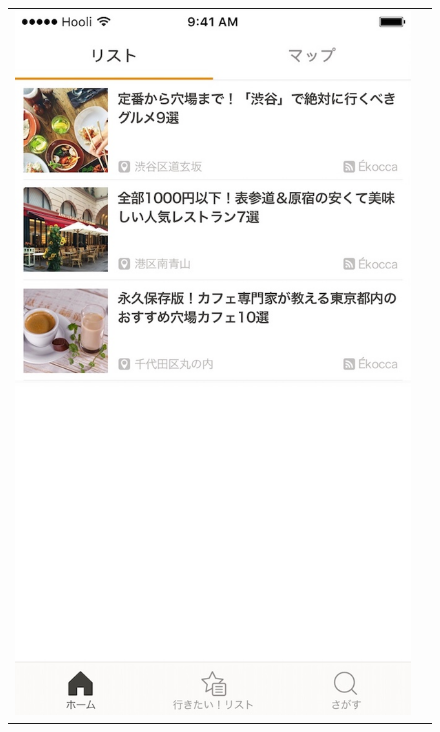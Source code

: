 \documentclass[a4paper]{jsarticle}
\begin{document}
\begin{enumerate}
\begin{enumerate}
\fifigure
\begin{figure}[H]
  \begin{center}
    \begin{tabular}{cc}
    \begin{minipage}{0.35\hsize}
	\includegraphics[width=\hsize]{./images/curation_favo_list.jpg}
    \end{minipage}
    &
    \begin{minipage}{0.35\hsize}

\end{minipage}
\end{tabular}
\end{center}
\end{figure}
\end{enumerate}
\end{enumerate}
\end{document}
